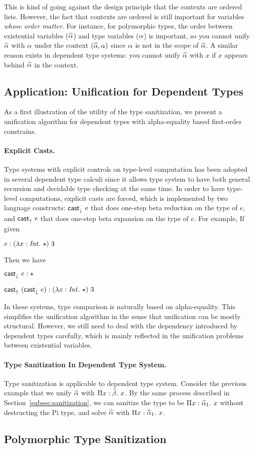 This is kind of going against the design principle that the contexts are ordered
lists. However, the fact that contexts are ordered is still important for
variables \textit{whose order matter}. For instance, for polymorphic types, the
order between existential variables ($\widehat{\alpha}$) and type variables ($\alpha$) is
important, so you cannot unify $\widehat{\alpha}$ with $\alpha$ under the context $(\widehat{\alpha},
\alpha)$ since $\alpha$ is not in the scope of $\widehat{\alpha}$. A similar reason exists in
dependent type systems: you cannot unify $\widehat{\alpha}$ with $x$ if $x$ appears behind
$\widehat{\alpha}$ in the context.

\subsection{Application: Unification for Dependent Types}

As a first illustration of the utility of the type sanitization, we present a
unification algorithm for dependent types with alpha-equality based
first-order constrains.

\paragraph{Explicit Casts.}

Type systems with explicit controls on type-level computation has been adopted
in several dependent type calculi \cite{???} since it allows type system to have
both general recursion and decidable type checking at the same time. In order to
have type-level computations, explicit casts are forced, which is implemented by
two language constructs: $\mathsf{cast}_\downarrow^{}~ e$ that does one-step beta reduction on the
type of $e$, and $\mathsf{cast}_\uparrow^{}~ e$ that does one-step beta expansion on the type of
$e$. For example, If given

$e: (\lambda x:\mathit{Int}.~ \star) ~ 3$

\noindent Then we have

$\mathsf{cast}_\downarrow^{}~ e : \star$

$\mathsf{cast}_\uparrow^{}~ (\mathsf{cast}_\downarrow^{}~ e) : (\lambda x:\mathit{Int}.~ \star) ~ 3$

In these systems, type comparison is naturally based on alpha-equality. This
simplifies the unification algorithm in the sense that unification can be mostly
structural. However, we still need to deal with the dependency introduced by
dependent types carefully, which is mainly reflected in the unification problems
between existential variables.

\paragraph{Type Sanitization In Dependent Type System.}
Type sanitization is applicable to dependent type system. Consider the previous
example that we unify $\widehat{\alpha}$ with $\Pi x:\widehat{\beta}.~ x$. By the same process
described in Section~\ref{subsec:sanitization}, we can sanitize the type to be
$\Pi x:\widehat{\alpha}_1.~ x$ without destructing the Pi type, and solve $\widehat{\alpha}$ with
$\Pi x:\widehat{\alpha}_1.~ x$.

\subsection{Polymorphic Type Sanitization}



